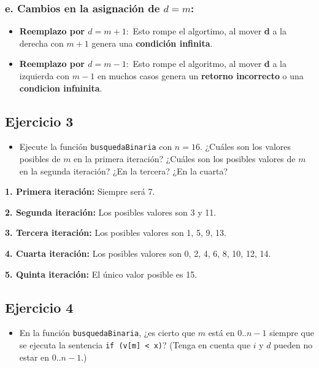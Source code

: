\documentclass{article}
\begin{document}
        \subsubsection*{e. Cambios en la asignación de \( d = m \):}
            \begin{itemize}
                \item \textbf{Reemplazo por \( d = m+1:\)} Esto rompe el algortimo, al mover \textbf{d} a la derecha con \( m+1 \) genera una \textbf{condición infinita}.
                
                \item \textbf{Reemplazo por \( d = m-1:\)} Esto rompe el algoritmo, al mover \textbf{d} a la izquierda con \( m-1 \) en muchos casos genera un \textbf{retorno incorrecto} o una \textbf{condicion infninita}.
            \end{itemize}

    \subsection{Ejercicio 3}
        \begin{itemize}
            \item Ejecute la función \texttt{busquedaBinaria} con \(n = 16\). ¿Cuáles son los valores posibles de \(m\) en la primera iteración? ¿Cuáles son los posibles valores de \(m\) en la segunda iteración? ¿En la tercera? ¿En la cuarta?
        \end{itemize}

        \textbf{1. Primera iteración:} Siempre será 7.

        \textbf{2. Segunda iteración:} Los posibles valores son 3 y 11.

        \textbf{3. Tercera iteración:} Los posibles valores son 1, 5, 9, 13.

        \textbf{4. Cuarta iteración:} Los posibles valores son 0, 2, 4, 6, 8, 10, 12, 14.

        \textbf{5. Quinta iteración:} El único valor posible es 15.

    \subsection{Ejercicio 4}
        \begin{itemize}
            \item En la función \texttt{busquedaBinaria}, ¿es cierto que \(m\) está en \(0..n-1\) siempre que se ejecuta la sentencia \texttt{if (v[m] < x)}? (Tenga en cuenta que \(i\) y \(d\) pueden no estar en \(0..n-1\).)
        \end{itemize}
\end{document}
